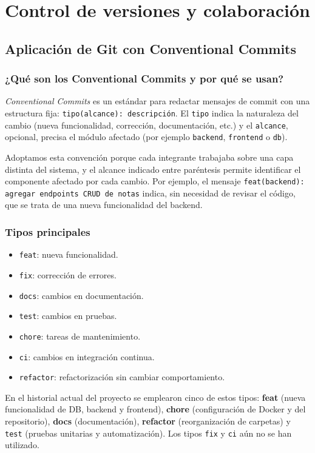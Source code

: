 \chapter{Control de versiones y colaboración}

\section{Aplicación de Git con Conventional Commits}

\subsection{¿Qué son los Conventional Commits y por qué se usan?}
\emph{Conventional Commits} es un estándar para redactar mensajes de commit con una estructura fija: \texttt{tipo(alcance): descripción}. El \texttt{tipo} indica la naturaleza del cambio (nueva funcionalidad, corrección, documentación, etc.) y el \texttt{alcance}, opcional, precisa el módulo afectado (por ejemplo \texttt{backend}, \texttt{frontend} o \texttt{db}).

Adoptamos esta convención porque cada integrante trabajaba sobre una capa distinta del sistema, y el alcance indicado entre paréntesis permite identificar el componente afectado por cada cambio. Por ejemplo, el mensaje \texttt{feat(backend): agregar endpoints CRUD de notas} indica, sin necesidad de revisar el código, que se trata de una nueva funcionalidad del backend.

\subsection{Tipos principales}
\begin{itemize}
  \item \texttt{feat}: nueva funcionalidad.
  \item \texttt{fix}: corrección de errores.
  \item \texttt{docs}: cambios en documentación.
  \item \texttt{test}: cambios en pruebas.
  \item \texttt{chore}: tareas de mantenimiento.
  \item \texttt{ci}: cambios en integración continua.
  \item \texttt{refactor}: refactorización sin cambiar comportamiento.
\end{itemize}

\begin{notebox}
En el historial actual del proyecto se emplearon cinco de estos tipos: \textcolor{gitfeat}{\textbf{feat}} (nueva funcionalidad de DB, backend y frontend), \textcolor{gitchore}{\textbf{chore}} (configuración de Docker y del repositorio), \textcolor{gitdocs}{\textbf{docs}} (documentación), \textcolor{gitrefactor}{\textbf{refactor}} (reorganización de carpetas) y \texttt{test} (pruebas unitarias y automatización). Los tipos \texttt{fix} y \texttt{ci} aún no se han utilizado.
\end{notebox}

